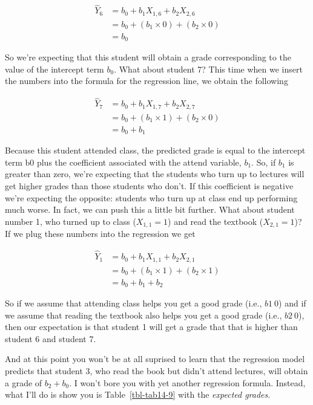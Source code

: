 \documentclass[
  a4paper,
]{book}
\begin{document}
\[
\begin{split}
\hat{Y}_6 & = b_0 + b_1 X_{1,6} + b_2 X_{2,6} \\
& = b_0 + (b_1 \times 0) + (b_2 \times 0) \\
& = b_0
\end{split}
\]

So we're expecting that this student will obtain a grade corresponding
to the value of the intercept term \(b_0\). What about student 7? This
time when we insert the numbers into the formula for the regression
line, we obtain the following

\[
\begin{split}
\hat{Y}_7 & = b_0 + b_1 X_{1,7} + b_2 X_{2,7} \\
& = b_0 + (b_1 \times 1) + (b_2 \times 0) \\
& = b_0 + b_1
\end{split}
\]

Because this student attended class, the predicted grade is equal to the
intercept term b0 plus the coefficient associated with the attend
variable, \(b_1\). So, if \(b_1\) is greater than zero, we're expecting
that the students who turn up to lectures will get higher grades than
those students who don't. If this coefficient is negative we're
expecting the opposite: students who turn up at class end up performing
much worse. In fact, we can push this a little bit further. What about
student number 1, who turned up to class (\(X_{1,1} = 1\)) and read the
textbook (\(X_{2,1} = 1\))? If we plug these numbers into the regression
we get

\[
\begin{split}
\hat{Y}_1 & = b_0 + b_1 X_{1,1} + b_2 X_{2,1} \\
& = b_0 + (b_1 \times 1) + (b_2 \times 1) \\
& = b_0 + b_1 + b_2
\end{split}
\]

So if we assume that attending class helps you get a good grade (i.e.,
\(b1 \> 0\)) and if we assume that reading the textbook also helps you
get a good grade (i.e., \(b2 \> 0\)), then our expectation is that
student 1 will get a grade that that is higher than student 6 and
student 7.

And at this point you won't be at all suprised to learn that the
regression model predicts that student 3, who read the book but didn't
attend lectures, will obtain a grade of \(b_{2} + b_{0}\). I won't bore
you with yet another regression formula. Instead, what I'll do is show
you is Table~\ref{tbl-tab14-9} with the \emph{expected grades}.
\end{document}
